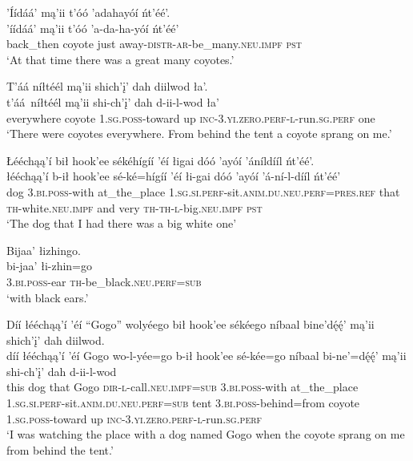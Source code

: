 \ea\label{ex:text6-15-2}
’Íídáá’ mą’ii t’óó ’adahayóí ńt’éé’.\\
\gll ’íídáá’	mą’ii	t’óó ’a-da-ha-yóí	ńt’éé’\\
     back\_then	coyote	just away-\textsc{distr}-\textsc{ar}-be\_many.\textsc{neu}.\textsc{impf}	\textsc{pst}\\
\glt `At that time there was a great many coyotes.'
\z

\newpage
\ea\label{ex:text6-15-3}
T’áá níłtéél mą’ii shich’į’ dah diilwod ła’.\\
\gll t’áá~{níłtéél}	mą’ii	shi-ch’į’	dah	d-ii-l-wod	ła’\\
     everywhere	coyote	1.\textsc{sg}.\textsc{poss}-toward	up	\textsc{inc}-3.\textsc{yi}.\textsc{zero}.\textsc{perf}-\textsc{l}-run.\textsc{sg}.\textsc{perf}	one\\
\glt `There were coyotes everywhere. From behind the tent a coyote sprang on me.'
\z

\ea\label{ex:text6-15-4}
Łééchąą’í bił hook’ee sékéhígíí ’éí łigai dóó ’ayóí ’áníldííl ńt’éé’.\\
\gll łééchąą’í	b-ił	hook’ee	sé-ké=hígíí	’éí	łi-gai	dóó	’ayóí	’á-ní-l-dííl	ńt’éé’\\
     dog	3.\textsc{bi}.\textsc{poss}-with	at\_the\_place	1.\textsc{sg}.\textsc{si}.\textsc{perf}-sit.\textsc{anim}.\textsc{du}.\textsc{neu}.\textsc{perf}=\textsc{pres}.\textsc{ref}	that	\textsc{th}-white.\textsc{neu}.\textsc{impf}	and	very	\textsc{th}-\textsc{th}-\textsc{l}-big.\textsc{neu}.\textsc{impf}	\textsc{pst}\\
\glt `The dog that I had there was a big white one'
\z

\ea\label{ex:text6-15-5}
Bijaa’ łizhingo.\\
\gll bi-jaa’	łi-zhin=go\\
     3.\textsc{bi}.\textsc{poss}-ear	\textsc{th}-be\_black.\textsc{neu}.\textsc{perf}=\textsc{sub}\\
\glt `with black ears.'
\z

\ea\label{ex:text6-15-6}
Díí łééchąą’í ’éí ``Gogo'' wolyéego bił hook’ee sékéego níbaal bine’dę́ę́’ mą’ii shich’į’ dah diilwod.\\
\gll díí	łééchąą’í	’éí	Gogo	wo-l-yée=go	b-ił	hook’ee	sé-kée=go	níbaal	bi-ne’=dę́ę́’	mą’ii	shi-ch’į’	dah	d-ii-l-wod\\
     this	dog	that	Gogo	\textsc{dir}-\textsc{l}-call.\textsc{neu}.\textsc{impf}=\textsc{sub}	3.\textsc{bi}.\textsc{poss}-with	at\_the\_place	1.\textsc{sg}.\textsc{si}.\textsc{perf}-sit.\textsc{anim}.\textsc{du}.\textsc{neu}.\textsc{perf}=\textsc{sub}	tent	3.\textsc{bi}.\textsc{poss}-behind=from	coyote	1.\textsc{sg}.\textsc{poss}-toward	up	\textsc{inc}-3.\textsc{yi}.\textsc{zero}.\textsc{perf}-\textsc{l}-run.\textsc{sg}.\textsc{perf}\\
\glt `I was watching the place with a dog named Gogo when the coyote sprang on me from behind the tent.'
\z

